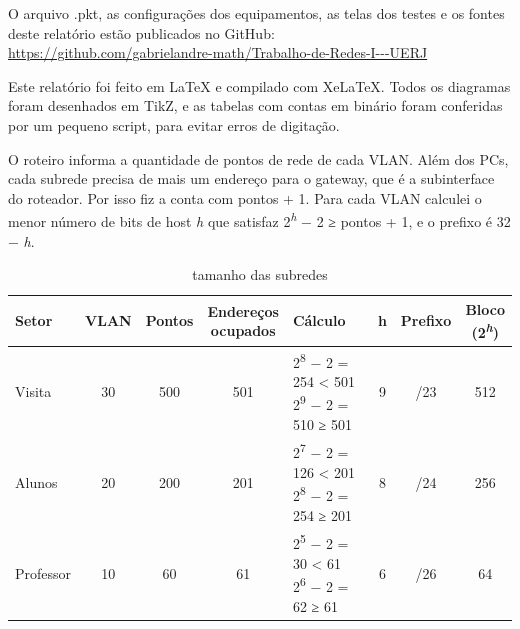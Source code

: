 O arquivo .pkt, as configurações dos equipamentos, as telas dos testes e os fontes deste relatório estão publicados no GitHub:\\
\ghicon\hspace{0.45em}\url{https://github.com/gabrielandre-math/Trabalho-de-Redes-I---UERJ}

Este relatório foi feito em LaTeX e compilado com XeLaTeX. Todos os diagramas foram desenhados em TikZ, e as tabelas com contas em binário foram conferidas por um pequeno script, para evitar erros de digitação.



O roteiro informa a quantidade de pontos de rede de cada VLAN. Além dos PCs, cada subrede precisa de mais um endereço para o gateway, que é a subinterface do roteador. Por isso fiz a conta com pontos + 1. Para cada VLAN calculei o menor número de bits de host \textit{h} que satisfaz 2\textsuperscript{\textit{h}} − 2 ≥ pontos + 1, e o prefixo é 32 − \textit{h}.

\begin{table}[H]
\caption{tamanho das subredes}\label{tab:tamanho}
\small\renewcommand{\arraystretch}{1.25}
\begin{tabularx}{\textwidth}{@{}lccc>{\centering\arraybackslash}Xccc@{}}
\toprule
\textbf{Setor} & \textbf{VLAN} & \textbf{Pontos} & \makecell{\textbf{Endereços}\\\textbf{ocupados}} & \textbf{Cálculo} & \textbf{h} & \textbf{Prefixo} & \makecell{\textbf{Bloco}\\\textbf{(2\textsuperscript{\textit{h}})}}\\
\midrule
Visita & 30 & 500 & 501 & \makecell{2\textsuperscript{8} − 2 = 254 < 501\\2\textsuperscript{9} − 2 = 510 ≥ 501} & 9 & /23 & 512\\[3pt]
Alunos & 20 & 200 & 201 & \makecell{2\textsuperscript{7} − 2 = 126 < 201\\2\textsuperscript{8} − 2 = 254 ≥ 201} & 8 & /24 & 256\\[3pt]
Professor & 10 & 60 & 61 & \makecell{2\textsuperscript{5} − 2 = 30 < 61\\2\textsuperscript{6} − 2 = 62 ≥ 61} & 6 & /26 & 64\\
\bottomrule
\end{tabularx}
\fonte
\end{table}

